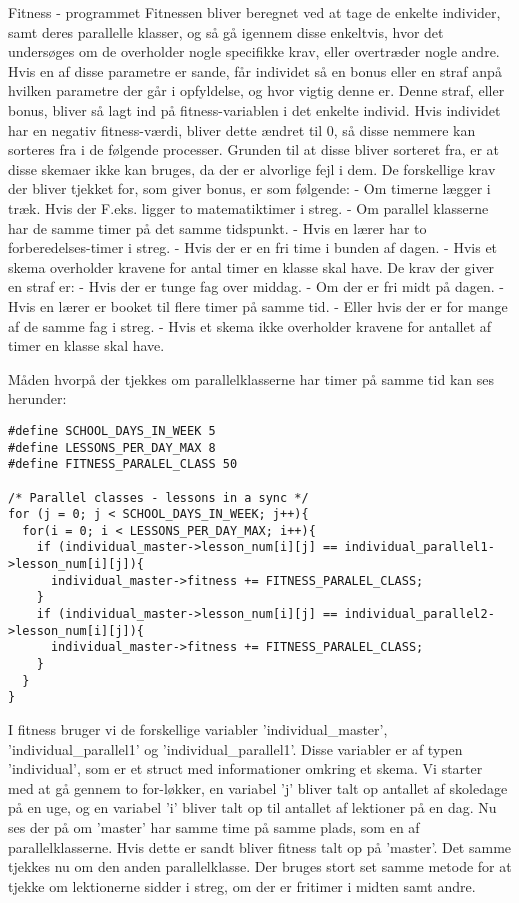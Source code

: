 Fitness - programmet
Fitnessen bliver beregnet ved at tage de enkelte individer, samt deres parallelle klasser, og så gå igennem disse enkeltvis, hvor det undersøges om de overholder nogle specifikke krav, eller overtræder nogle andre. Hvis en af disse parametre er sande, får individet så en bonus eller en straf anpå hvilken parametre der går i opfyldelse, og hvor vigtig denne er. Denne straf, eller bonus, bliver så lagt ind på fitness-variablen i det enkelte individ. Hvis individet har en negativ fitness-værdi, bliver dette ændret til 0, så disse nemmere kan sorteres fra i de følgende processer. Grunden til at disse bliver sorteret fra, er at disse skemaer ikke kan bruges, da der er alvorlige fejl i dem.
De forskellige krav der bliver tjekket for, som giver bonus, er som følgende:
   -	Om timerne lægger i træk. Hvis der F.eks. ligger to matematiktimer i streg.
   -	Om parallel klasserne har de samme timer på det samme tidspunkt. 
   -	Hvis en lærer har to forberedelses-timer i streg.
   -	Hvis der er en fri time i bunden af dagen.
   -	Hvis et skema overholder kravene for antal timer en klasse skal have.
De krav der giver en straf er:
   -	Hvis der er tunge fag over middag.
   -	Om der er fri midt på dagen.
   -	Hvis en lærer er booket til flere timer på samme tid.
   -	Eller hvis der er for mange af de samme fag i streg.
   -	Hvis et skema ikke overholder kravene for antallet af timer en klasse skal have.

Måden hvorpå der tjekkes om parallelklasserne har timer på samme tid kan ses herunder:

\begin{lstlisting}
#define SCHOOL_DAYS_IN_WEEK 5
#define LESSONS_PER_DAY_MAX 8
#define FITNESS_PARALEL_CLASS 50

/* Parallel classes - lessons in a sync */
for (j = 0; j < SCHOOL_DAYS_IN_WEEK; j++){
  for(i = 0; i < LESSONS_PER_DAY_MAX; i++){
    if (individual_master->lesson_num[i][j] == individual_parallel1->lesson_num[i][j]){
      individual_master->fitness += FITNESS_PARALEL_CLASS;
    }
    if (individual_master->lesson_num[i][j] == individual_parallel2->lesson_num[i][j]){
      individual_master->fitness += FITNESS_PARALEL_CLASS;
    }
  }
}
\end{lstlisting}

I fitness bruger vi de forskellige variabler ’individual\_master’, ’individual\_parallel1’ og ’individual\_parallel1’. Disse variabler er af typen ’individual’, som er et struct med informationer omkring et skema.
Vi starter med at gå gennem to for-løkker, en variabel ’j’ bliver talt op antallet af skoledage på en uge, og en variabel ’i’ bliver talt op til antallet af lektioner på en dag. Nu ses der på om ’master’ har samme time på samme plads, som en af parallelklasserne. Hvis dette er sandt bliver fitness talt op på ’master’. Det samme tjekkes nu om den anden parallelklasse. 
Der bruges stort set samme metode for at tjekke om lektionerne sidder i streg, om der er fritimer i midten samt andre.
